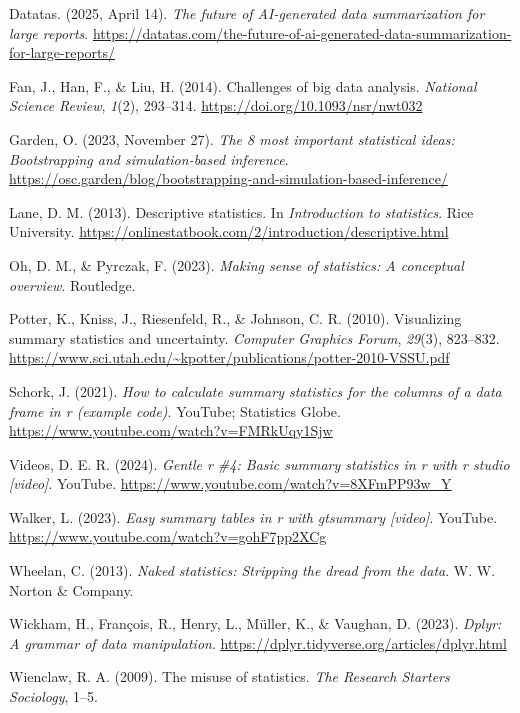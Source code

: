 \documentclass[
  man,
  floatsintext,
  longtable,
  nolmodern,
  notxfonts,
  notimes,
  colorlinks=true,linkcolor=blue,citecolor=blue,urlcolor=blue]{apa7}
\newlength{\cslhangindent}
\newenvironment{CSLReferences}[2] %
 {\begin{list}{}{%
  \setlength{\itemindent}{0pt}
  \setlength{\leftmargin}{0pt}
  \setlength{\parsep}{0pt}
  \ifodd #1
   \setlength{\leftmargin}{\cslhangindent}
   \setlength{\itemindent}{-1\cslhangindent}
  \fi
  \setlength{\itemsep}{#2\baselineskip}}}
 {\end{list}}
\begin{document}
\label{refs}
\begin{CSLReferences}{1}{0}
Datatas. (2025, April 14). \emph{The future of AI-generated data
summarization for large reports}.
\url{https://datatas.com/the-future-of-ai-generated-data-summarization-for-large-reports/}

Fan, J., Han, F., \& Liu, H. (2014). Challenges of big data analysis.
\emph{National Science Review}, \emph{1}(2), 293--314.
\url{https://doi.org/10.1093/nsr/nwt032}

Garden, O. (2023, November 27). \emph{The 8 most important statistical
ideas: Bootstrapping and simulation-based inference}.
\url{https://osc.garden/blog/bootstrapping-and-simulation-based-inference/}

Lane, D. M. (2013). Descriptive statistics. In \emph{Introduction to
statistics}. Rice University.
\url{https://onlinestatbook.com/2/introduction/descriptive.html}

Oh, D. M., \& Pyrczak, F. (2023). \emph{Making sense of statistics: A
conceptual overview}. Routledge.

Potter, K., Kniss, J., Riesenfeld, R., \& Johnson, C. R. (2010).
Visualizing summary statistics and uncertainty. \emph{Computer Graphics
Forum}, \emph{29}(3), 823--832.
\url{https://www.sci.utah.edu/~kpotter/publications/potter-2010-VSSU.pdf}

Schork, J. (2021). \emph{How to calculate summary statistics for the
columns of a data frame in r (example code)}. YouTube; Statistics Globe.
\url{https://www.youtube.com/watch?v=FMRkUqy1Sjw}

Videos, D. E. R. (2024). \emph{Gentle r \#4: Basic summary statistics in
r with r studio {[}video{]}}. YouTube.
\url{https://www.youtube.com/watch?v=8XFmPP93w_Y}

Walker, L. (2023). \emph{Easy summary tables in r with gtsummary
{[}video{]}}. YouTube. \url{https://www.youtube.com/watch?v=gohF7pp2XCg}

Wheelan, C. (2013). \emph{Naked statistics: Stripping the dread from the
data}. W. W. Norton \& Company.

Wickham, H., François, R., Henry, L., Müller, K., \& Vaughan, D. (2023).
\emph{Dplyr: A grammar of data manipulation}.
\url{https://dplyr.tidyverse.org/articles/dplyr.html}

Wienclaw, R. A. (2009). The misuse of statistics. \emph{The Research
Starters Sociology}, 1--5.

\end{CSLReferences}
\end{document}
